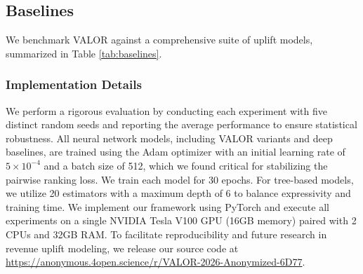 \documentclass[runningheads]{llncs}
\begin{document}
\subsection{Baselines}
We benchmark VALOR against a comprehensive suite of uplift models, summarized in Table \ref{tab:baselines}.

\begin{table}[h]
\centering
\caption{Summary of Baseline Models}
\label{tab:baselines}
\end{table}

\subsubsection{Implementation Details}
We perform a rigorous evaluation by conducting each experiment with five distinct random seeds and reporting the average performance to ensure statistical robustness. All neural network models, including VALOR variants and deep baselines, are trained using the Adam optimizer with an initial learning rate of $5 \times 10^{-4}$ and a batch size of 512, which we found critical for stabilizing the pairwise ranking loss. We train each model for 30 epochs. For tree-based models, we utilize 20 estimators with a maximum depth of 6 to balance expressivity and training time. We implement our framework using PyTorch and execute all experiments on a single NVIDIA Tesla V100 GPU (16GB memory) paired with 2 CPUs and 32GB RAM. To facilitate reproducibility and future research in revenue uplift modeling, we release our source code at \href{https://anonymous.4open.science/r/VALOR-2026-Anonymized-6D77}{\color{blue}https://anonymous.4open.science/r/VALOR-2026-Anonymized-6D77}.
\end{document}

